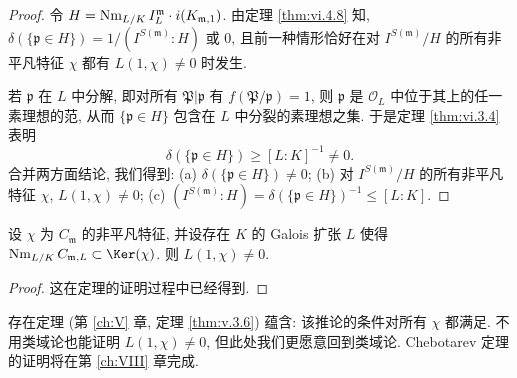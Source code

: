 \begin{proof}
令 $H=\operatorname{Nm}_{L/K}I_{L}^{\mathfrak{m}}\cdot i(K_{\mathfrak{m},1})$. 由定理 \ref{thm:vi.4.8} 知, $\delta(\{\mathfrak{p}\in H\})=1/(I^{S(\mathfrak{m})}:H)$ 或 $0$, 且前一种情形恰好在对 $I^{S(\mathfrak{m})}/H$ 的所有非平凡特征 $\chi$ 都有 $L(1,\chi)\ne0$ 时发生.

若 $\mathfrak{p}$ 在 $L$ 中分解, 即对所有 $\mathfrak{P}|\mathfrak{p}$ 有 $f(\mathfrak{P}/\mathfrak{p})=1$, 则 $\mathfrak{p}$ 是 $\mathcal{O}_L$ 中位于其上的任一素理想的范, 从而 $\{\mathfrak{p}\in H\}$ 包含在 $L$ 中分裂的素理想之集. 于是定理 \ref{thm:vi.3.4} 表明
\[
\delta(\{\mathfrak{p}\in H\})\ge[L:K]^{-1}\ne0.
\]
合并两方面结论, 我们得到:
(a) $\delta(\{\mathfrak{p}\in H\})\ne0$;
(b) 对 $I^{S(\mathfrak{m})}/H$ 的所有非平凡特征 $\chi$, $L(1,\chi)\ne0$;
(c) $(I^{S(\mathfrak{m})}:H)=\delta(\{\mathfrak{p}\in H\})^{-1}\le[L:K]$.
\end{proof}

\begin{corollary}\label{cor:vi.4.10}
设 $\chi$ 为 $C_{\mathfrak{m}}$ 的非平凡特征, 并设存在 $K$ 的 Galois 扩张 $L$ 使得 $\Nm_{L/K}C_{\mathfrak{m},L}\subset\Ker(\chi)$. 则 $L(1,\chi)\ne0$.
\end{corollary}

\begin{proof}
这在定理的证明过程中已经得到.
\end{proof}

存在定理 (第 \ref{ch:V} 章, 定理 \ref{thm:v.3.6}) 蕴含: 该推论的条件对所有 $\chi$ 都满足. 不用类域论也能证明 $L(1,\chi)\ne0$, 但此处我们更愿意回到类域论. Chebotarev 定理的证明将在第 \ref{ch:VIII} 章完成.
